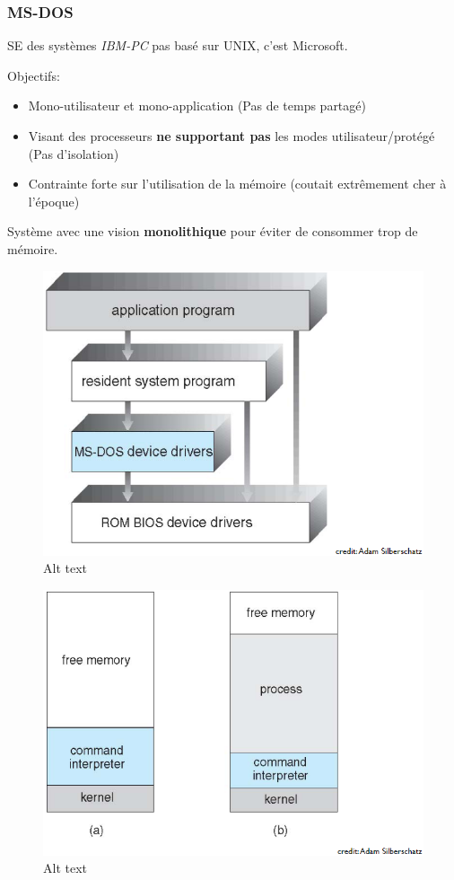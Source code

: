 \subsubsection{MS-DOS}\label{ms-dos}

SE des systèmes \emph{IBM-PC} pas basé sur UNIX, c'est Microsoft.

Objectifs:

\begin{itemize}
\tightlist
\item
  Mono-utilisateur et mono-application (Pas de temps partagé)
\item
  Visant des processeurs \textbf{ne supportant pas} les modes
  utilisateur/protégé (Pas d'isolation)
\item
  Contrainte forte sur l'utilisation de la mémoire (coutait extrêmement
  cher à l'époque)
\end{itemize}

Système avec une vision \textbf{monolithique} pour éviter de consommer
trop de mémoire.

\begin{figure}
\centering
\includegraphics{image-16.png}
\caption{Alt text}
\end{figure}

\begin{figure}
\centering
\includegraphics{image-17.png}
\caption{Alt text}
\end{figure}

